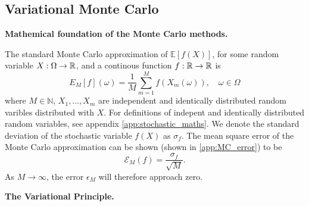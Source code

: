 \subsection*{Variational Monte Carlo}

\textbf{Mathemical foundation of the Monte Carlo methods.}

The standard Monte Carlo approximation of $\mathbb{E}[f(X)]$, for some random variable $X:\Omega\to\mathbb{R}$, and a continous function $f:\mathbb{R}\to\mathbb{R}$ is
\begin{equation}
    E_M[f](\omega)= \frac{1}{M}\sum_{m=1}^Mf(X_m(\omega)), \quad \omega\in\Omega
\end{equation}
where $M\in\mathbb{N}$, $X_1, \dots, X_m$ are independent and identically distributed random varibles distributed with $X$. For definitions of indepent and identically distributed random variables, see appendix \ref{app:stochastic_maths}. We denote the standard deviation of the stochastic variable $f(X)$ as $\sigma_f$. The mean square error of the Monte Carlo approximation can be shown (shown in \ref{app:MC_error}) to be 
\begin{equation}
    \mathcal{E}_M(f) = \frac{\sigma_f}{\sqrt{M}}. 
\end{equation}
As $M\to\infty$, the error $\epsilon_M$ will therefore approach zero.

\textbf{The Variational Principle.}

